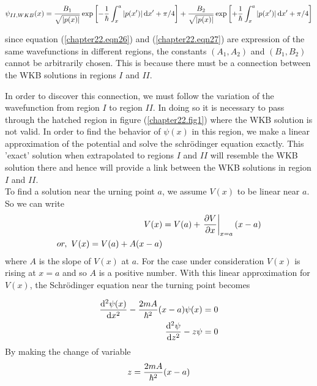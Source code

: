 \begin{equation}
\label{chapter22.eqn27}
\psi_{II,WKB}(x) = \frac{B_1}{\sqrt{\abs{p(x)}}} \exp \qty[-\frac{1}{\hbar} \int_{x}^{a} \abs{p(x^\prime)} \dd{x^\prime} + \pi/4]  +  \frac{B_2}{\sqrt{\abs{p(x)}}} \exp \qty[+\frac{1}{\hbar} \int_{x}^{a} \abs{p(x^\prime)} \dd{x^\prime} + \pi/4]
\end{equation}

since equation (\ref{chapter22.eqn26}) and (\ref{chapter22.eqn27}) are expression of the same wavefunctions in different regions, the constants $(A_1, A_2)$ and $(B_1,B_2)$ cannot be arbitrarily chosen. This is because there must be a connection between the WKB solutions in regions $I$ and $II$.

In order to discover this connection, we must follow the variation of the wavefunction from region $I$ to region $II$. In doing so it is necessary to pass through the hatched region in figure (\ref{chapter22.fig1}) where the WKB solution is not valid. In order to find the behavior of $\psi(x)$ in this region, we make a linear approximation of the potential and solve the schr\"{o}dinger equation exactly. This 'exact' solution when extrapolated to regions $I$ and $II$ will resemble the WKB solution there and hence will provide a link between the WKB solutions in region $I$ and $II$.\\


To find a solution near the urning point $a$, we assume $V(x)$ to be linear near $a$. So we can write
\begin{align}
V(x) &= V(a) + \eval{\pdv{V}{x}}_{x=a} \qty(x - a) \nonumber\\
\label{chapter22.eqn28}
or, \ V(x) = V(a) + A \qty(x-a)
\end{align}
where $A$ is the slope of $V(x)$ at $a$. For the case under consideration $V(x)$ is rising at $x=a$ and so $A$ is a positive number. With this linear approximation for $V(x)$, the Schr\"{o}dinger equation near the turning point becomes

\begin{align}
	\dv[2]{\psi(x)}{x} - \frac{2 m A}{\hbar^2} \qty(x-a) \psi(x) &= 0 \nonumber\\
	\label{chapter22.eqn31}
	\dv[2]{\psi}{z} - z \psi &= 0 \\
\end{align}
By making the change of variable
\begin{equation}
	\label{chapter22.eqn30}
	z = \frac{2 m A}{\hbar^2} \qty(x-a)
\end{equation}

